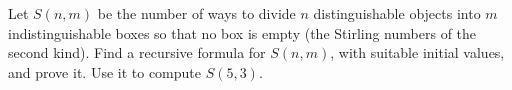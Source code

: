Let $S(n,m)$ be the number of ways to divide $n$ distinguishable objects into $m$ indistinguishable boxes so that no box is empty (the Stirling numbers of the second kind). Find a recursive formula for $S(n,m)$, with suitable initial values, and prove it. Use it to compute $S(5,3)$.
